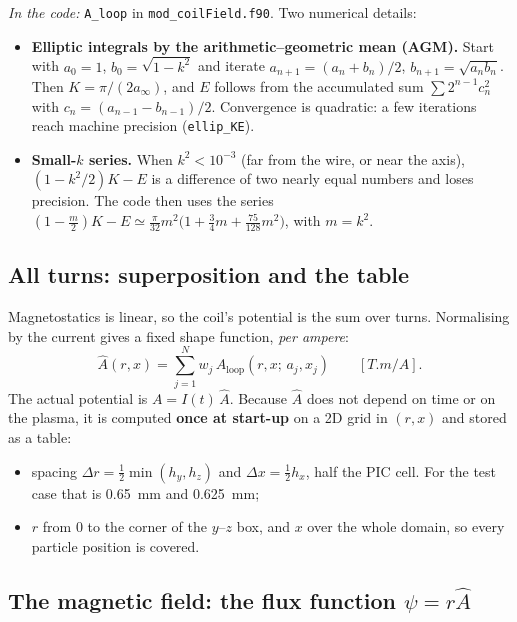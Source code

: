 \documentclass[11pt,a4paper]{article}
\newcommand{\Ahat}{\hat{A}}
\newcommand{\code}[1]{\texttt{#1}}
\newcommand{\incode}[1]{\par\smallskip\noindent\textit{In the code:} #1\par\smallskip}
\begin{document}
\incode{\code{A\_loop} in \code{mod\_coilField.f90}. Two numerical details:}
\begin{itemize}
  \item \textbf{Elliptic integrals by the arithmetic--geometric mean (AGM).}
        Start with $a_0=1$, $b_0=\sqrt{1-k^2}$ and iterate
        $a_{n+1}=(a_n+b_n)/2$, $b_{n+1}=\sqrt{a_nb_n}$. Then
        $K = \pi/(2a_\infty)$, and $E$ follows from the accumulated sum
        $\sum 2^{n-1}c_n^2$ with $c_n = (a_{n-1}-b_{n-1})/2$. Convergence is
        quadratic: a few iterations reach machine precision
        (\code{ellip\_KE}).
  \item \textbf{Small-$k$ series.} When $k^2 < 10^{-3}$ (far from the wire,
        or near the axis), $(1-k^2/2)K - E$ is a difference of two nearly
        equal numbers and loses precision. The code then uses the series
        $(1-\tfrac{m}{2})K - E \simeq \tfrac{\pi}{32}m^2
        \big(1 + \tfrac34 m + \tfrac{75}{128}m^2\big)$, with $m=k^2$.
\end{itemize}

\subsection{All turns: superposition and the table}

Magnetostatics is linear, so the coil's potential is the sum over turns.
Normalising by the current gives a fixed shape function, \emph{per ampere}:
\begin{equation}
  \Ahat(r,x) = \sum_{j=1}^{N} w_j\,A_{\mathrm{loop}}(r,x;\,a_j,x_j)
  \qquad[\si{T.m/A}].
\end{equation}
The actual potential is $A = I(t)\,\Ahat$. Because $\Ahat$ does not depend
on time or on the plasma, it is computed \textbf{once at start-up} on a 2D
grid in $(r,x)$ and stored as a table:
\begin{itemize}
  \item spacing $\Delta r = \tfrac12\min(h_y,h_z)$ and
        $\Delta x = \tfrac12 h_x$, half the PIC cell. For the test case
        that is \SI{0.65}{mm} and \SI{0.625}{mm};
  \item $r$ from 0 to the corner of the $y$--$z$ box, and $x$ over the
        whole domain, so every particle position is covered.
\end{itemize}

\subsection{The magnetic field: the flux function $\psi = r\Ahat$}
\label{sec:psi}
\end{document}
